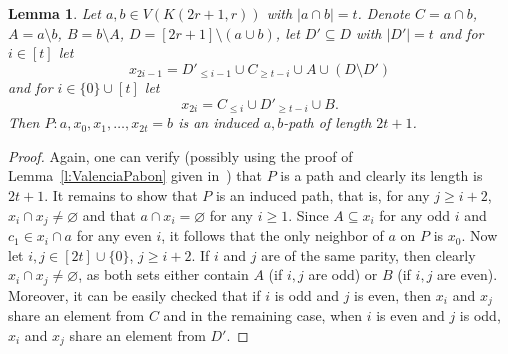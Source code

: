 \documentclass[a4paper,11pt]{article}
\newtheorem{lemma}[theorem]{Lemma}
\renewcommand{\emptyset}{\varnothing}
\begin{document}
\begin{lemma}\label{l:ValenciaPabon-2}
    Let $a,b \in V(K(2r+1,r))$ with $|a \cap b|=t$. Denote $C=a\cap b$, $A=a \setminus b$, $B=b \setminus A$, $D=[2r+1]\setminus(a \cup b)$, let $D'\subseteq D$ with $|D'|=t$    
    and for $i \in [t]$ let $$x_{2i-1}= D'_{\leq i-1} \cup C_{\geq t-i} \cup A\cup (D\setminus D')$$ and for $i \in \{0\}\cup[t]$ let $$x_{2i}=C_{\leq i} \cup D'_{\geq t-i} \cup B.$$ 
    Then $P:a,x_0,x_1,\ldots , x_{2t}=b$ is an induced $a,b$-path of length $2t+1$. 
\end{lemma}
\begin{proof}
    Again, one can verify (possibly using the proof of Lemma~\ref{l:ValenciaPabon} given in~\cite{valencia2005diameter}) that $P$ is a path and clearly its length is $2t+1$. It remains to show that $P$ is an induced path, that is, for any $j \geq i+2$, $x_i \cap x_j \neq \emptyset$ and that $a \cap x_i = \emptyset$ for any $i \geq 1$. Since $A \subseteq x_i$ for any odd $i$ and $c_1 \in x_i \cap a$ for any even $i$, it follows that the only neighbor of $a$ on $P$ is $x_0$. Now let $i,j \in [2t]\cup \{0\}$, $j \geq i+2.$ If $i$ and $j$ are of the same parity, then clearly $x_i \cap x_j \neq \emptyset$, as both sets either contain $A$ (if $i,j$ are odd) or $B$ (if $i,j$ are even). Moreover, it can be easily checked that if $i$ is odd and $j$ is even, then $x_i$ and $x_j$ share an element from $C$ and in the remaining case, when $i$ is even and $j$ is odd, $x_i$ and $x_j$ share an element from $D'$.
\end{proof}
\end{document}

